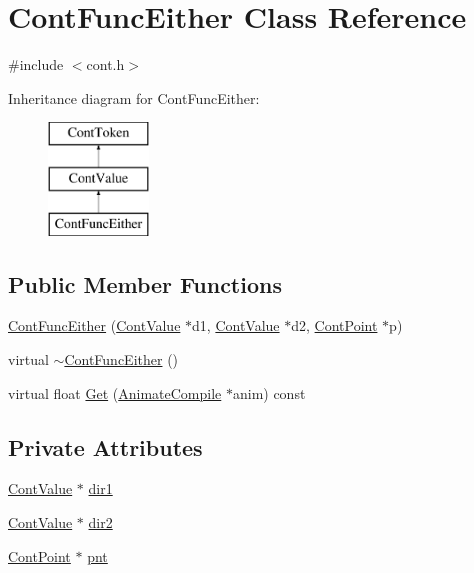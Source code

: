 \hypertarget{a00056}{\section{Cont\-Func\-Either Class Reference}
\label{a00056}
}


{\ttfamily \#include $<$cont.\-h$>$}

Inheritance diagram for Cont\-Func\-Either\-:\begin{figure}[H]
\begin{center}
\leavevmode
\includegraphics[height=3.000000cm]{a00056}
\end{center}
\end{figure}
\subsection*{Public Member Functions}
\begin{DoxyCompactItemize}
\item 
\hyperlink{a00056_abb1aa4e2ca328032e00da37314bd6104}{Cont\-Func\-Either} (\hyperlink{a00086}{Cont\-Value} $\ast$d1, \hyperlink{a00086}{Cont\-Value} $\ast$d2, \hyperlink{a00062}{Cont\-Point} $\ast$p)
\item 
virtual \hyperlink{a00056_af85381508aea6c81e26cc73aabb2846b}{$\sim$\-Cont\-Func\-Either} ()
\item 
virtual float \hyperlink{a00056_af0ef72e3cbf2d0fc95e834f552e138ce}{Get} (\hyperlink{a00007}{Animate\-Compile} $\ast$anim) const 
\end{DoxyCompactItemize}
\subsection*{Private Attributes}
\begin{DoxyCompactItemize}
\item 
\hyperlink{a00086}{Cont\-Value} $\ast$ \hyperlink{a00056_a34dc3d7f09ab0d1eeba98592e2b1ca71}{dir1}
\item 
\hyperlink{a00086}{Cont\-Value} $\ast$ \hyperlink{a00056_affc948c83c590f610d5c02230237d7fa}{dir2}
\item 
\hyperlink{a00062}{Cont\-Point} $\ast$ \hyperlink{a00056_a04b8c169797d08e1bbf9d21ecc1ec6d2}{pnt}
\end{DoxyCompactItemize}
